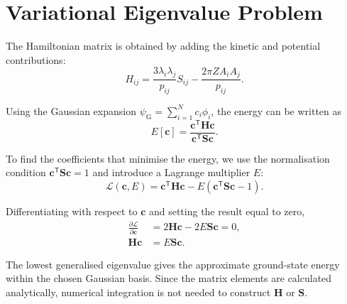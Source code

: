 \section{Variational Eigenvalue Problem}

The Hamiltonian matrix is obtained by adding the
kinetic and potential contributions:
\begin{equation}
    H_{ij}
    =\frac{3\lambda_i\lambda_j}{p_{ij}}S_{ij}
    -\frac{2\pi ZA_iA_j}{p_{ij}}.
    \label{eq:appendix-hamiltonian}
\end{equation}

Using the Gaussian expansion
$\psi_{\mathrm G}=\sum_{i=1}^{N}c_i\phi_i$,
the energy can be written as
\begin{equation*}
    E[\mathbf c]
    =\frac{\mathbf c^{\mathsf T}\mathbf H\mathbf c}
           {\mathbf c^{\mathsf T}\mathbf S\mathbf c}.
\end{equation*}

To find the coefficients that minimise the energy,
we use the normalisation condition
$\mathbf c^{\mathsf T}\mathbf S\mathbf c=1$
and introduce a Lagrange multiplier $E$:
\begin{equation*}
    \mathcal L(\mathbf c,E)
    =\mathbf c^{\mathsf T}\mathbf H\mathbf c
    -E(\mathbf c^{\mathsf T}\mathbf S\mathbf c-1).
\end{equation*}

Differentiating with respect to $\mathbf c$
and setting the result equal to zero,
\begin{align*}
    \frac{\partial\mathcal L}{\partial\mathbf c}
    &=2\mathbf H\mathbf c-2E\mathbf S\mathbf c=0,\\
    \mathbf H\mathbf c&=E\mathbf S\mathbf c.
\end{align*}

The lowest generalised eigenvalue gives the
approximate ground-state energy within the chosen
Gaussian basis. Since the matrix elements are
calculated analytically, numerical integration
is not needed to construct $\mathbf H$ or
$\mathbf S$.

